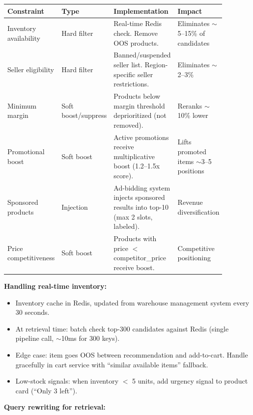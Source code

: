 \begin{tabular}{|p{0.18\linewidth}|p{0.10\linewidth}|p{0.38\linewidth}|p{0.22\linewidth}|}
\hline
\textbf{Constraint} & \textbf{Type} & \textbf{Implementation} & \textbf{Impact} \\
\hline
Inventory availability & Hard filter & Real-time Redis check. Remove OOS products. & Eliminates $\sim$5--15\% of candidates \\
\hline
Seller eligibility & Hard filter & Banned/suspended seller list. Region-specific seller restrictions. & Eliminates $\sim$2--3\% \\
\hline
Minimum margin & Soft boost/suppress & Products below margin threshold deprioritized (not removed). & Reranks $\sim$10\% lower \\
\hline
Promotional boost & Soft boost & Active promotions receive multiplicative boost (1.2--1.5x score). & Lifts promoted items $\sim$3--5 positions \\
\hline
Sponsored products & Injection & Ad-bidding system injects sponsored results into top-10 (max 2 slots, labeled). & Revenue diversification \\
\hline
Price competitiveness & Soft boost & Products with price $<$ competitor\_price receive boost. & Competitive positioning \\
\hline
\end{tabular}

\textbf{Handling real-time inventory:}

\begin{itemize}
  \item Inventory cache in Redis, updated from warehouse management system every 30 seconds.
  \item At retrieval time: batch check top-300 candidates against Redis (single pipeline call, $\sim$10ms for 300 keys).
  \item Edge case: item goes OOS between recommendation and add-to-cart. Handle gracefully in cart service with ``similar available items'' fallback.
  \item Low-stock signals: when inventory $<$ 5 units, add urgency signal to product card (``Only 3 left'').
\end{itemize}

\textbf{Query rewriting for retrieval:}

